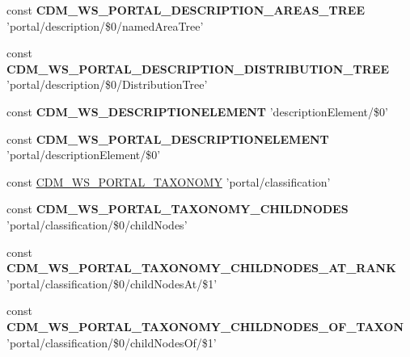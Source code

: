 \begin{DoxyCompactItemize}
\item 
\hypertarget{webservice__uris_8php_a4a41a6f045c237070e4803e19ff78c52}{const {\bfseries C\-D\-M\-\_\-\-W\-S\-\_\-\-P\-O\-R\-T\-A\-L\-\_\-\-D\-E\-S\-C\-R\-I\-P\-T\-I\-O\-N\-\_\-\-A\-R\-E\-A\-S\-\_\-\-T\-R\-E\-E} 'portal/description/\$0/named\-Area\-Tree'}\label{webservice__uris_8php_a4a41a6f045c237070e4803e19ff78c52}

\item 
\hypertarget{webservice__uris_8php_a322e2eb69c1b177e97963408aee9186b}{const {\bfseries C\-D\-M\-\_\-\-W\-S\-\_\-\-P\-O\-R\-T\-A\-L\-\_\-\-D\-E\-S\-C\-R\-I\-P\-T\-I\-O\-N\-\_\-\-D\-I\-S\-T\-R\-I\-B\-U\-T\-I\-O\-N\-\_\-\-T\-R\-E\-E} 'portal/description/\$0/Distribution\-Tree'}\label{webservice__uris_8php_a322e2eb69c1b177e97963408aee9186b}

\item 
\hypertarget{webservice__uris_8php_aac8d05a05b56b3f3b2dda8349cab3f22}{const {\bfseries C\-D\-M\-\_\-\-W\-S\-\_\-\-D\-E\-S\-C\-R\-I\-P\-T\-I\-O\-N\-E\-L\-E\-M\-E\-N\-T} 'description\-Element/\$0'}\label{webservice__uris_8php_aac8d05a05b56b3f3b2dda8349cab3f22}

\item 
\hypertarget{webservice__uris_8php_adbad3979e485f537f23bfc4166b4d41e}{const {\bfseries C\-D\-M\-\_\-\-W\-S\-\_\-\-P\-O\-R\-T\-A\-L\-\_\-\-D\-E\-S\-C\-R\-I\-P\-T\-I\-O\-N\-E\-L\-E\-M\-E\-N\-T} 'portal/description\-Element/\$0'}\label{webservice__uris_8php_adbad3979e485f537f23bfc4166b4d41e}

\item 
const \hyperlink{webservice__uris_8php_a34b556d66b797c90ccd91145c4a89b02}{C\-D\-M\-\_\-\-W\-S\-\_\-\-P\-O\-R\-T\-A\-L\-\_\-\-T\-A\-X\-O\-N\-O\-M\-Y} 'portal/classification'
\item 
\hypertarget{webservice__uris_8php_a90f7b59855b2e3d935d4e0874a61b0cd}{const {\bfseries C\-D\-M\-\_\-\-W\-S\-\_\-\-P\-O\-R\-T\-A\-L\-\_\-\-T\-A\-X\-O\-N\-O\-M\-Y\-\_\-\-C\-H\-I\-L\-D\-N\-O\-D\-E\-S} 'portal/classification/\$0/child\-Nodes'}\label{webservice__uris_8php_a90f7b59855b2e3d935d4e0874a61b0cd}

\item 
\hypertarget{webservice__uris_8php_ade8bb2866a9aa39d8ea82cd1cff97229}{const {\bfseries C\-D\-M\-\_\-\-W\-S\-\_\-\-P\-O\-R\-T\-A\-L\-\_\-\-T\-A\-X\-O\-N\-O\-M\-Y\-\_\-\-C\-H\-I\-L\-D\-N\-O\-D\-E\-S\-\_\-\-A\-T\-\_\-\-R\-A\-N\-K} 'portal/classification/\$0/child\-Nodes\-At/\$1'}\label{webservice__uris_8php_ade8bb2866a9aa39d8ea82cd1cff97229}

\item 
\hypertarget{webservice__uris_8php_afece665e77a1be75cc85679f0f8b3c93}{const {\bfseries C\-D\-M\-\_\-\-W\-S\-\_\-\-P\-O\-R\-T\-A\-L\-\_\-\-T\-A\-X\-O\-N\-O\-M\-Y\-\_\-\-C\-H\-I\-L\-D\-N\-O\-D\-E\-S\-\_\-\-O\-F\-\_\-\-T\-A\-X\-O\-N} 'portal/classification/\$0/child\-Nodes\-Of/\$1'}\label{webservice__uris_8php_afece665e77a1be75cc85679f0f8b3c93}


\end{DoxyCompactItemize}
